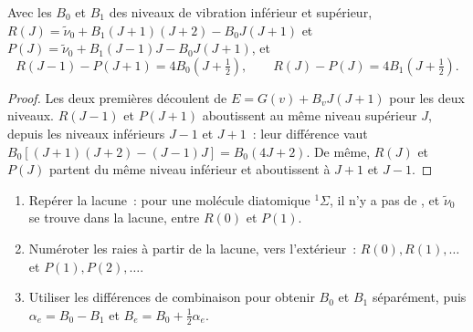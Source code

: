 \begin{theorem}\label{thm:b3:rovibrational-spectroscopy:combination-differences}
Avec les  $B_0$ et $B_1$ des niveaux de vibration
inférieur et supérieur, $R(J) = \tilde\nu_0 + B_1(J+1)(J+2) - B_0J(J+1)$ et $P(J) = \tilde\nu_0 +
B_1(J-1)J - B_0J(J+1)$, et
\[
R(J - 1) - P(J + 1) = 4B_0(J + \tfrac12), \qquad R(J) - P(J) = 4B_1(J + \tfrac12).
\]
\end{theorem}

\begin{proof}
Les deux premières découlent de $E = G(v) + B_vJ(J+1)$ pour les deux
niveaux. $R(J - 1)$ et
$P(J + 1)$ aboutissent au même niveau supérieur $J$, depuis les niveaux
inférieurs $J - 1$ et $J + 1$~:
leur différence vaut $B_0[(J+1)(J+2) - (J-1)J] = B_0(4J + 2)$. De même,
$R(J)$ et
$P(J)$ partent du même niveau inférieur et aboutissent à $J + 1$ et
$J - 1$.
\end{proof}

\begin{method}\label{met:b3:rovibrational-spectroscopy:combination}
\begin{enumerate}
  \item Repérer la lacune~: pour une molécule diatomique ${}^1\Sigma$, il
        n'y a pas de , et
        $\tilde\nu_0$ se trouve dans la lacune, entre $R(0)$ et $P(1)$.
  \item Numéroter les raies à partir de la lacune, vers l'extérieur~:
        $R(0), R(1), \dots$ et $P(1),
        P(2), \dots$.
  \item Utiliser les différences de combinaison pour obtenir $B_0$ et
        $B_1$
        séparément, puis $\alpha_e = B_0 - B_1$ et $B_e = B_0 + \frac12\alpha_e$.
\end{enumerate}
\end{method}

